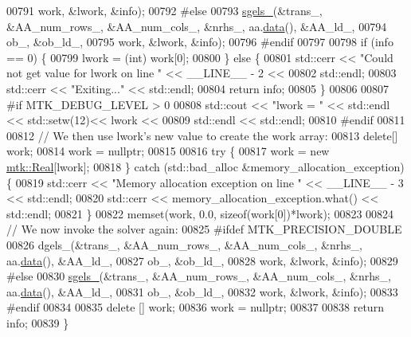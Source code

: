 \begin{DoxyCode}
00791          work, &lwork, &info);
00792 \textcolor{preprocessor}{  #else}
00793   \hyperlink{namespacemtk_ada6df1b733204aa7ff0b1ec7556288f9}{sgels\_}(&trans\_, &AA\_num\_rows\_, &AA\_num\_cols\_, &nrhs\_, aa.\hyperlink{classmtk_1_1DenseMatrix_a0c33b8a9e01d157c61ddbdf807c25d84}{data}(), &AA\_ld\_,
00794          ob\_, &ob\_ld\_,
00795          work, &lwork, &info);
00796 \textcolor{preprocessor}{  #endif}
00797 
00798   \textcolor{keywordflow}{if} (info == 0) \{
00799     lwork = (int) work[0];
00800   \} \textcolor{keywordflow}{else} \{
00801     std::cerr << \textcolor{stringliteral}{"Could not get value for lwork on line "} << \_\_LINE\_\_ - 2 <<
00802       std::endl;
00803     std::cerr << \textcolor{stringliteral}{"Exiting..."} << std::endl;
00804     \textcolor{keywordflow}{return} info;
00805   \}
00806 
00807 \textcolor{preprocessor}{  #if MTK\_DEBUG\_LEVEL > 0}
00808   std::cout << \textcolor{stringliteral}{"lwork = "} << std::endl << std::setw(12)<< lwork <<
00809     std::endl << std::endl;
00810 \textcolor{preprocessor}{  #endif}
00811 
00812   \textcolor{comment}{// We then use lwork's new value to create the work array:}
00813   \textcolor{keyword}{delete}[] work;
00814   work = \textcolor{keyword}{nullptr};
00815 
00816   \textcolor{keywordflow}{try} \{
00817     work = \textcolor{keyword}{new} \hyperlink{group__c01-roots_gac080bbbf5cbb5502c9f00405f894857d}{mtk::Real}[lwork];
00818   \} \textcolor{keywordflow}{catch} (std::bad\_alloc &memory\_allocation\_exception) \{
00819     std::cerr << \textcolor{stringliteral}{"Memory allocation exception on line "} << \_\_LINE\_\_ - 3 << std::endl;
00820     std::cerr << memory\_allocation\_exception.what() << std::endl;
00821   \}
00822   memset(work, 0.0, \textcolor{keyword}{sizeof}(work[0])*lwork);
00823 
00824   \textcolor{comment}{// We now invoke the solver again:}
00825 \textcolor{preprocessor}{  #ifdef MTK\_PRECISION\_DOUBLE}
00826   dgels\_(&trans\_, &AA\_num\_rows\_, &AA\_num\_cols\_, &nrhs\_, aa.\hyperlink{classmtk_1_1DenseMatrix_a0c33b8a9e01d157c61ddbdf807c25d84}{data}(), &AA\_ld\_,
00827          ob\_, &ob\_ld\_,
00828          work, &lwork, &info);
00829 \textcolor{preprocessor}{  #else}
00830   \hyperlink{namespacemtk_ada6df1b733204aa7ff0b1ec7556288f9}{sgels\_}(&trans\_, &AA\_num\_rows\_, &AA\_num\_cols\_, &nrhs\_, aa.\hyperlink{classmtk_1_1DenseMatrix_a0c33b8a9e01d157c61ddbdf807c25d84}{data}(), &AA\_ld\_,
00831          ob\_, &ob\_ld\_,
00832          work, &lwork, &info);
00833 \textcolor{preprocessor}{  #endif}
00834 
00835   \textcolor{keyword}{delete} [] work;
00836   work = \textcolor{keyword}{nullptr};
00837 
00838   \textcolor{keywordflow}{return} info;
00839 \}
\end{DoxyCode}
